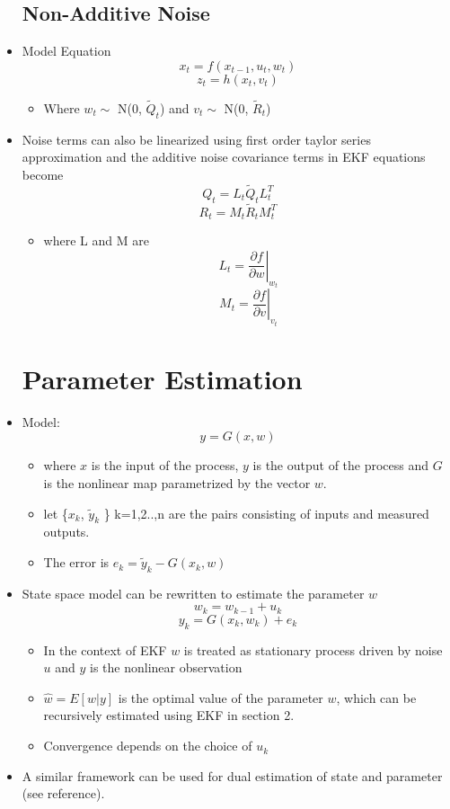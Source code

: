 \documentclass{article}
\begin{document}
\begin{itemize}
\subsection{Non-Additive Noise}
\item Model Equation $$x_{t} = f(x_{t-1},  u_t, w_t)$$    $$z_{t} = h(x_{t}, v_t)$$
\begin{itemize}
\item Where $w_t \sim$ N(0, $\tilde Q_t$) and  $v_t \sim$ N(0, $\tilde R_t$)
\end{itemize}
\item Noise terms can also be linearized using first order taylor series approximation and the additive noise covariance terms in EKF equations become 
$$Q_t=L_t\tilde Q_t L_t^T$$ $$R_t = M_t\tilde R_t M_t^T$$
\begin{itemize}
\item where L and M are $$L_t=\left. \frac{\partial f}{\partial w} \right |_{w_t}$$ $$M_t=\left. \frac{\partial f}{\partial v} \right |_{v_t}$$
\end{itemize}

\section{Parameter Estimation}
\item Model: $$y=G(x,w)$$
\begin{itemize}
\item where $x$ is the input of the process, $y$ is the output of the process and $G$ is the nonlinear map parametrized by the vector $w$. 
\item let \{$x_k$, $\tilde y_k$ \} k=1,2..,n are the pairs consisting of inputs and measured outputs. 
\item The error is $e_k=\tilde y_k - G(x_k,w)$
\end{itemize}
\item State space model can be rewritten to estimate the parameter $w$ 
$$w_k=w_{k-1}+u_k$$ $$y_k=G(x_k,w_k)+e_k$$
\begin{itemize}
\item In the context of EKF $w$ is treated as stationary process driven by noise $u$  and $y$ is the nonlinear observation
\item $\hat w=E[w|y]$ is the optimal value of the parameter $w$, which can be recursively estimated using EKF in section 2.
\item Convergence depends on the choice of $u_k$
\end{itemize} 
\item A similar framework can be used for dual estimation of state and parameter (see reference). 

\end{itemize}
\end{document}
